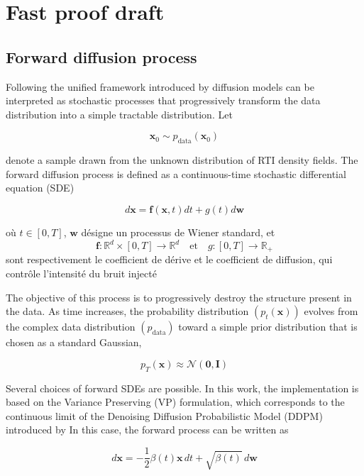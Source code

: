 \documentclass[11pt,a4paper]{article}
\begin{document}
\section*{Fast proof draft}

\subsection{Forward diffusion process}

Following the unified framework introduced by diffusion models can be interpreted as stochastic processes that progressively transform the data distribution into a simple tractable distribution. Let

\begin{equation}
\mathbf{x}_0 \sim p_{\mathrm{data}}(\mathbf{x}_0)
\end{equation}


denote a sample drawn from the unknown distribution of RTI density fields. The forward diffusion process is defined as a continuous-time stochastic differential equation (SDE)

\begin{equation}
d\mathbf{x}
=
\mathbf{f}(\mathbf{x},t)dt
+
g(t)d\mathbf{w}
\end{equation}

où $t\in[0,T]$, $\mathbf{w}$ désigne un processus de Wiener standard, et
\[
\mathbf{f}:\mathbb{R}^{d}\times[0,T]\to\mathbb{R}^{d}
\quad\text{et}\quad
g:[0,T]\to\mathbb{R}_{+}
\]
sont respectivement le coefficient de dérive et le coefficient de diffusion,
qui contrôle l'intensité du bruit injecté 

The objective of this process is to progressively destroy the structure present in the data. As time increases, the probability distribution $(p_t(\mathbf{x}))$ evolves from the complex data distribution $(p_{\mathrm{data}})$ toward a simple prior distribution that is chosen as a standard Gaussian,

\begin{equation}
p_T(\mathbf{x})
\approx
\mathcal{N}(\mathbf{0},\mathbf{I})
\end{equation}

Several choices of forward SDEs are possible. In this work, the implementation is based on the Variance Preserving (VP) formulation, which corresponds to the continuous limit of the Denoising Diffusion Probabilistic Model (DDPM) introduced by In this case, the forward process can be written as

\begin{equation}
d\mathbf{x}
=
-\frac{1}{2}\beta(t)\mathbf{x}\,dt
+
\sqrt{\beta(t)}\,d\mathbf{w}
\end{equation}
\end{document}
